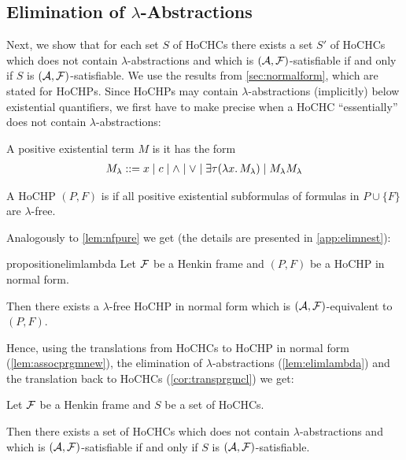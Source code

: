 \documentclass[a4paper,twoside,notitlepage,openright,11pt]{report}
\begin{document}
\subsection{Elimination of $\lambda$-Abstractions}
Next, we show that for each set $S$ of HoCHCs there exists a set $S'$ of HoCHCs which does not contain $\lambda$-abstractions and which is $(\mathcal A,\mathcal F)$-satisfiable if and only if $S$ is $(\mathcal A,\mathcal F)$-satisfiable. We use the results from \cref{sec:normalform}, which are stated for HoCHPs. Since HoCHPs may contain $\lambda$-abstractions (implicitly) below existential quantifiers, we first have to make precise when a HoCHC ``essentially'' does not contain $\lambda$-abstractions:
\begin{definition}
  \begin{thmlist}
  \item A positive existential term $M$ is  it has the form
    \begin{align*}
      M_\lambda::=x\mid c\mid\land\mid\lor\mid \exists\tau(\lambda x\ldotp M_\lambda)\mid M_\lambda M_\lambda
    \end{align*}
  \item A HoCHP $(P,F)$ is  if all positive existential subformulas of formulas in $P\cup\{F\}$ are $\lambda$-free.
  \end{thmlist}
\end{definition}
Analogously to \cref{lem:nfpure} we get (the details are presented in \cref{app:elimnest}):
\begin{restatable}{proposition}{elimlambda}
  \label{lem:elimlambda}
  Let $\mathcal F$ be a Henkin frame and $(P,F)$ be a HoCHP in normal form.

  Then there exists a $\lambda$-free HoCHP in normal form which is $(\mathcal A,\mathcal F)$-equivalent to $(P,F)$.
\end{restatable}

Hence, using the translations from HoCHCs to HoCHP in normal form (\cref{lem:assocprgmnew}), the elimination of $\lambda$-abstractions (\cref{lem:elimlambda}) and the translation back to HoCHCs (\cref{cor:transprgmcl}) we get:
\begin{theorem}
  \label{thm:ellambdahochc}
  Let $\mathcal F$ be a Henkin frame and $S$ be a set of HoCHCs. 

  Then there exists a set of HoCHCs which does not contain $\lambda$-abstractions and which is $(\mathcal A,\mathcal F)$-satisfiable if and only if $S$ is $(\mathcal A,\mathcal F)$-satisfiable.
\end{theorem}
\end{document}
